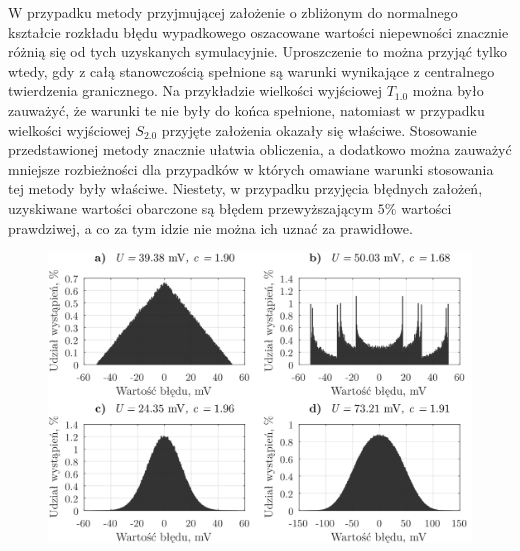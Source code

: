 W przypadku metody przyjmującej założenie o zbliżonym do normalnego kształcie rozkładu błędu wypadkowego oszacowane wartości niepewności znacznie różnią się od tych uzyskanych symulacyjnie. Uproszczenie to można przyjąć tylko wtedy, gdy z całą stanowczością spełnione są warunki wynikające z centralnego twierdzenia granicznego. Na przykładzie wielkości wyjściowej $T_{1.0}$ można było zauważyć, że warunki te nie były do końca spełnione, natomiast w przypadku wielkości wyjściowej $S_{2.0}$ przyjęte założenia okazały się właściwe. Stosowanie przedstawionej metody znacznie ułatwia obliczenia, a dodatkowo można zauważyć mniejsze rozbieżności dla przypadków w których omawiane warunki stosowania tej metody były właściwe. Niestety, w przypadku przyjęcia błędnych założeń, uzyskiwane wartości obarczone są błędem przewyższającym $5\%$ wartości prawdziwej, a co za tym idzie nie można ich uznać za prawidłowe.

\begin{figure}[htb!]
\begin{center}
\includegraphics{obrazki/hist_part_S}
\end{center}
\end{figure}

